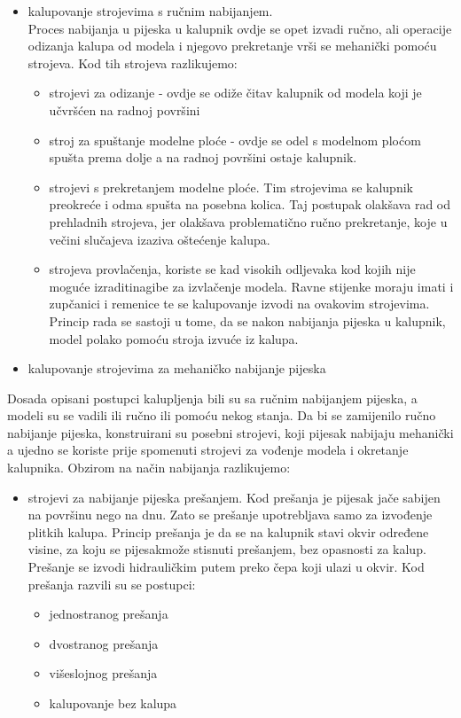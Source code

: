\documentclass[a4paper,12pt]{article}
\numberwithin{figure}{section}
\begin{document}
\begin{itemize}
\item kalupovanje strojevima s ručnim nabijanjem.\\
Proces nabijanja u pijeska u kalupnik ovdje se opet izvadi ručno, ali operacije odizanja kalupa od modela i njegovo prekretanje vrši se mehanički pomoću strojeva. Kod tih strojeva razlikujemo:
\begin{itemize}
\item strojevi za odizanje - ovdje se odiže čitav kalupnik od modela koji je učvršćen na radnoj površini
\item stroj za spuštanje modelne ploće - ovdje se odel s modelnom ploćom spušta prema dolje a na radnoj površini ostaje kalupnik.
\item strojevi s prekretanjem modelne ploće. Tim strojevima se kalupnik preokreće i odma spušta na posebna kolica. Taj postupak olakšava rad od prehladnih strojeva, jer olakšava problematično ručno prekretanje, koje u večini slučajeva izaziva oštećenje kalupa.
\item strojeva provlačenja, koriste se kad visokih odljevaka kod kojih nije moguće izraditinagibe za izvlačenje modela. Ravne stijenke moraju imati i zupčanici i remenice te se kalupovanje izvodi na ovakovim strojevima. Princip rada se sastoji u tome, da se nakon nabijanja pijeska u kalupnik, model polako pomoću stroja izvuće iz kalupa.
\end{itemize}
\item kalupovanje strojevima za mehaničko nabijanje pijeska
\end{itemize}
Dosada opisani postupci kalupljenja bili su sa ručnim nabijanjem pijeska, a modeli su se vadili ili ručno ili pomoću nekog stanja. Da bi se zamijenilo ručno nabijanje pijeska, konstruirani su posebni strojevi, koji pijesak nabijaju mehanički a ujedno se koriste prije spomenuti strojevi za vođenje modela i okretanje kalupnika. Obzirom na način nabijanja razlikujemo:
\begin{itemize}
\item strojevi za nabijanje pijeska prešanjem. Kod prešanja je pijesak jače sabijen na površinu nego na dnu. Zato se prešanje upotrebljava samo za izvođenje plitkih kalupa. Princip prešanja je da se na kalupnik stavi okvir određene visine, za koju se pijesakmože stisnuti prešanjem, bez opasnosti za kalup. Prešanje se izvodi hidrauličkim putem preko čepa koji ulazi u okvir. Kod prešanja razvili su se postupci:
\begin{itemize}
\item jednostranog prešanja
\item dvostranog prešanja
\item višeslojnog prešanja
\item kalupovanje bez kalupa
\end{itemize}
\end{itemize}
\end{document}
